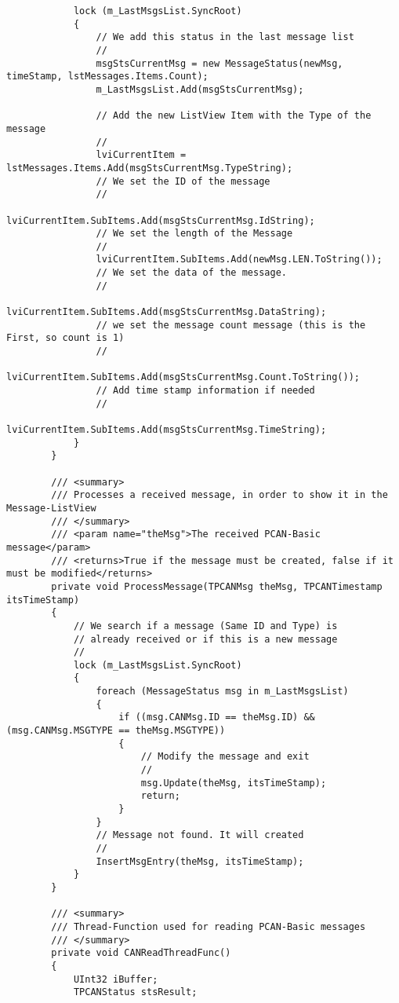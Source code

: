 \begin{lstlisting}
            lock (m_LastMsgsList.SyncRoot)
            {
                // We add this status in the last message list
                //
                msgStsCurrentMsg = new MessageStatus(newMsg, timeStamp, lstMessages.Items.Count);
                m_LastMsgsList.Add(msgStsCurrentMsg);

                // Add the new ListView Item with the Type of the message
                //
                lviCurrentItem = lstMessages.Items.Add(msgStsCurrentMsg.TypeString);
                // We set the ID of the message
                //
                lviCurrentItem.SubItems.Add(msgStsCurrentMsg.IdString);
                // We set the length of the Message
                //
                lviCurrentItem.SubItems.Add(newMsg.LEN.ToString());
                // We set the data of the message.
                //
                lviCurrentItem.SubItems.Add(msgStsCurrentMsg.DataString);
                // we set the message count message (this is the First, so count is 1)
                //
                lviCurrentItem.SubItems.Add(msgStsCurrentMsg.Count.ToString());
                // Add time stamp information if needed
                //
                lviCurrentItem.SubItems.Add(msgStsCurrentMsg.TimeString);
            }
        }

        /// <summary>
        /// Processes a received message, in order to show it in the Message-ListView
        /// </summary>
        /// <param name="theMsg">The received PCAN-Basic message</param>
        /// <returns>True if the message must be created, false if it must be modified</returns>
        private void ProcessMessage(TPCANMsg theMsg, TPCANTimestamp itsTimeStamp)
        {
            // We search if a message (Same ID and Type) is
            // already received or if this is a new message
            //
            lock (m_LastMsgsList.SyncRoot)
            {
                foreach (MessageStatus msg in m_LastMsgsList)
                {
                    if ((msg.CANMsg.ID == theMsg.ID) && (msg.CANMsg.MSGTYPE == theMsg.MSGTYPE))
                    {
                        // Modify the message and exit
                        //
                        msg.Update(theMsg, itsTimeStamp);
                        return;
                    }
                }
                // Message not found. It will created
                //
                InsertMsgEntry(theMsg, itsTimeStamp);
            }
        }

        /// <summary>
        /// Thread-Function used for reading PCAN-Basic messages
        /// </summary>
        private void CANReadThreadFunc()
        {
            UInt32 iBuffer;
            TPCANStatus stsResult;


\end{lstlisting}
